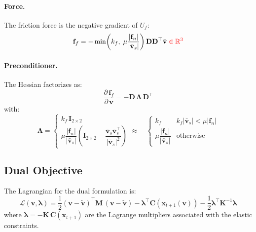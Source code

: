\documentclass{article}
\newcommand{\pd}[2]{\dfrac{\partial\, #1}{\partial\, #2}}
\newcommand{\red}[1]{\textcolor{red}{#1}}
\begin{document}
\paragraph{Force.}
The friction force is the negative gradient of $U_f$:
\begin{equation}
    \mathbf{f}_f = -\min\!\left(k_f,\; \mu\frac{|\mathbf{f}_n|}{|\bar{\mathbf{v}}_s|}\right) \mathbf{D}\mathbf{D}^\top \bar{\mathbf{v}}
    \;\red{\in \mathbb{R}^3}
\end{equation}

\paragraph{Preconditioner.}
The Hessian factorizes as:
\begin{equation}
    \pd{\mathbf{f}_f}{\mathbf{v}} = -\mathbf{D}\,\boldsymbol{\Lambda}\,\mathbf{D}^\top
\end{equation}
with:
\begin{equation}
    \boldsymbol{\Lambda} = 
    \begin{cases}
        k_f\,\mathbf{I}_{2\times 2} \\[1ex]
        \mu\dfrac{|\mathbf{f}_n|}{|\bar{\mathbf{v}}_s|}\left(\mathbf{I}_{2\times 2} - \dfrac{\bar{\mathbf{v}}_s\bar{\mathbf{v}}_s^\top}{|\bar{\mathbf{v}}_s|^2}\right)
    \end{cases}
    \approx\quad
    \begin{cases}
        k_f &  k_f|\bar{\mathbf{v}}_s| < \mu|\mathbf{f}_n| \\[1ex]
        \mu\dfrac{|\mathbf{f}_n|}{|\bar{\mathbf{v}}_s|} & \text{otherwise}
    \end{cases}
\end{equation}

\subsection{Dual Objective}

The Lagrangian for the dual formulation is:
%
\begin{equation}
\label{eq:dual_lagrangian}
    \mathcal{L}(\mathbf{v}, \boldsymbol{\lambda}) = 
    \frac{1}{2}(\mathbf{v} - \tilde{\mathbf{v}})^\top\mathbf{M}\,(\mathbf{v} - \tilde{\mathbf{v}})
    - \boldsymbol{\lambda}^\top \mathbf{C}(\mathbf{x}_{t+1}(\mathbf{v})) 
    - \frac{1}{2}\boldsymbol{\lambda}^\top \mathbf{K}^{-1} \boldsymbol{\lambda}
\end{equation}
%
where $\boldsymbol{\lambda} = -\mathbf{K}\,\mathbf{C}(\mathbf{x}_{t+1})$ 
are the Lagrange multipliers associated with the elastic constraints.
\end{document}
